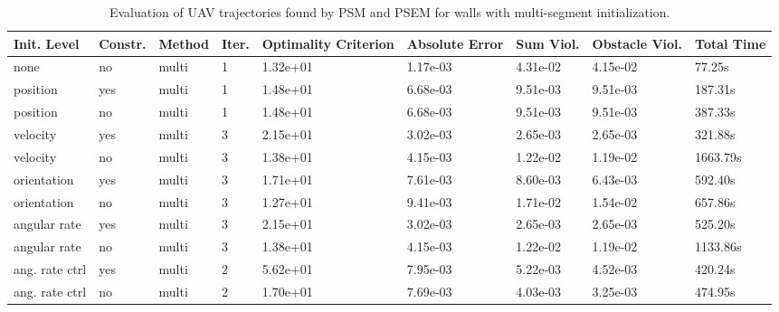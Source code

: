 \begin{table}
\small

\caption{Evaluation of UAV trajectories found by PSM and PSEM for walls with multi-segment initialization.}
\label{tab:traj-plan-eval-walls-multi}
\begin{tabular}{p{21mm}p{9mm}p{12mm}p{6mm}p{14mm}p{14mm}p{14mm}p{14mm}p{14mm}}
\toprule
Init. Level & Constr. & Method & Iter. & Optimality Criterion & Absolute Error & Sum Viol. & Obstacle Viol. & Total Time \\
\midrule
none & no & multi & \cellcolor{color3} 1 & \cellcolor{color10} 1.32e+01 & \cellcolor{color3} 1.17e-03 & \cellcolor{color8} 4.31e-02 & \cellcolor{color8} 4.15e-02 & \cellcolor{color3} 77.25s \\
position & yes & multi & \cellcolor{color3} 1 & 1.48e+01 & 6.68e-03 & 9.51e-03 & 9.51e-03 & \cellcolor{color10} 187.31s \\
position & no & multi & \cellcolor{color3} 1 & 1.48e+01 & 6.68e-03 & 9.51e-03 & 9.51e-03 & 387.33s \\
velocity & yes & multi & \cellcolor{color8} 3 & \cellcolor{color9} 2.15e+01 & \cellcolor{color10} 3.02e-03 & \cellcolor{color3} 2.65e-03 & \cellcolor{color3} 2.65e-03 & 321.88s \\
velocity & no & multi & \cellcolor{color8} 3 & 1.38e+01 & 4.15e-03 & 1.22e-02 & 1.19e-02 & \cellcolor{color8} 1663.79s \\
orientation & yes & multi & \cellcolor{color8} 3 & 1.71e+01 & 7.61e-03 & 8.60e-03 & 6.43e-03 & 592.40s \\
orientation & no & multi & \cellcolor{color8} 3 & \cellcolor{color3} 1.27e+01 & \cellcolor{color8} 9.41e-03 & \cellcolor{color9} 1.71e-02 & \cellcolor{color9} 1.54e-02 & 657.86s \\
angular rate & yes & multi & \cellcolor{color8} 3 & \cellcolor{color9} 2.15e+01 & \cellcolor{color10} 3.02e-03 & \cellcolor{color3} 2.65e-03 & \cellcolor{color3} 2.65e-03 & 525.20s \\
angular rate & no & multi & \cellcolor{color8} 3 & 1.38e+01 & 4.15e-03 & 1.22e-02 & 1.19e-02 & \cellcolor{color9} 1133.86s \\
ang. rate ctrl & yes & multi & 2 & \cellcolor{color8} 5.62e+01 & \cellcolor{color9} 7.95e-03 & 5.22e-03 & 4.52e-03 & 420.24s \\
ang. rate ctrl & no & multi & 2 & 1.70e+01 & 7.69e-03 & 4.03e-03 & 3.25e-03 & 474.95s \\
\bottomrule
\end{tabular}
\end{table}
